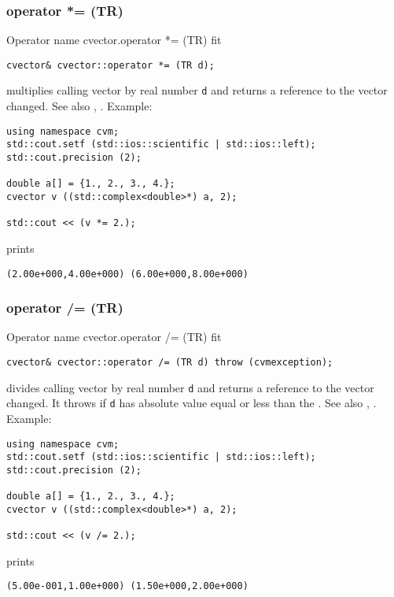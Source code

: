 \subsubsection{operator *= (TR)}
Operator%
\pdfdest name {cvector.operator *= (TR)} fit
\begin{verbatim}
cvector& cvector::operator *= (TR d);
\end{verbatim}
multiplies  calling vector by real number \verb"d"
and returns a reference to
the vector changed.
See also ,
.
Example:
\begin{Verbatim}
using namespace cvm;
std::cout.setf (std::ios::scientific | std::ios::left);
std::cout.precision (2);

double a[] = {1., 2., 3., 4.};
cvector v ((std::complex<double>*) a, 2);

std::cout << (v *= 2.);
\end{Verbatim}
prints
\begin{Verbatim}
(2.00e+000,4.00e+000) (6.00e+000,8.00e+000)
\end{Verbatim}
\newpage



\subsubsection{operator /= (TR)}
Operator%
\pdfdest name {cvector.operator /= (TR)} fit
\begin{verbatim}
cvector& cvector::operator /= (TR d) throw (cvmexception);
\end{verbatim}
divides  calling vector by real number \verb"d"
and returns a reference to
the vector changed.
It throws  
if \verb"d" has  absolute value equal or less
than the
.
See also ,
.
Example:
\begin{Verbatim}
using namespace cvm;
std::cout.setf (std::ios::scientific | std::ios::left);
std::cout.precision (2);

double a[] = {1., 2., 3., 4.};
cvector v ((std::complex<double>*) a, 2);

std::cout << (v /= 2.);
\end{Verbatim}
prints
\begin{Verbatim}
(5.00e-001,1.00e+000) (1.50e+000,2.00e+000)
\end{Verbatim}
\newpage



